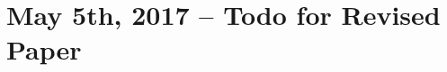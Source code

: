 \documentclass[12pt]{article}
\begin{document}
%
%

\section{May 5th, 2017 -- Todo for Revised Paper}
\end{document}
